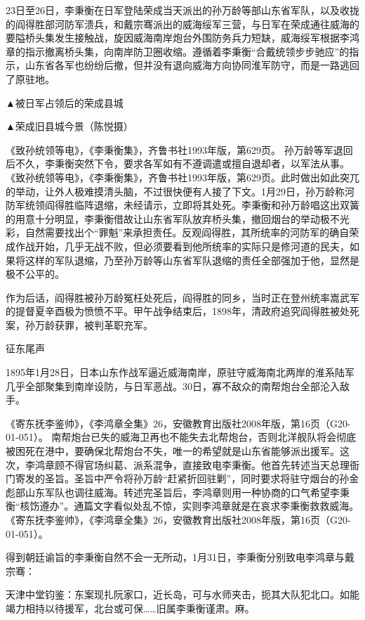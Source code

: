 \documentclass[12pt,UTF8]{ctexbook}
\begin{document}
23日至26日，李秉衡在日军登陆荣成当天派出的孙万龄等部山东省军队，以及收拢的阎得胜部河防军溃兵，和戴宗骞派出的威海绥军三营，与日军在荣成通往威海的要隘桥头集发生接触战，旋因威海南岸炮台外围防务兵力短缺，威海绥军根据李鸿章的指示撤离桥头集，向南岸防卫圈收缩。遵循着李秉衡“合戴统领步步驰应”的指示，山东省各军也纷纷后撤，但并没有退向威海方向协同淮军防守，而是一路逃回了原驻地。


▲被日军占领后的荣成县城


▲荣成旧县城今景（陈悦摄）

《致孙统领等电》，《李秉衡集》，齐鲁书社1993年版，第629页。
孙万龄等军退回后不久，李秉衡突然下令，要求各军如有不遵调遣或擅自退却者，以军法从事。 《致孙统领等电》，《李秉衡集》，齐鲁书社1993年版，第629页。此时做出如此突兀的举动，让外人极难摸清头脑，不过很快便有人接了下文。1月29日，孙万龄称河防军统领阎得胜临阵退缩，未经请示，立即将其处死。李秉衡和孙万龄唱这出双簧的用意十分明显，李秉衡借故让山东省军队放弃桥头集，撤回烟台的举动极不光彩，自然需要找出个“罪魁”来承担责任。反观阎得胜，其所统率的河防军的确自荣成作战开始，几乎无战不败，但必须要看到他所统率的实际只是修河道的民夫，如果将这样的军队退缩，乃至孙万龄等山东省军队退缩的责任全部强加于他，显然是极不公平的。

作为后话，阎得胜被孙万龄冤枉处死后，阎得胜的同乡，当时正在登州统率嵩武军的提督夏辛酉极为愤愤不平。甲午战争结束后，1898年，清政府追究阎得胜被处死案，孙万龄获罪，被判革职充军。

征东尾声

1895年1月28日，日本山东作战军逼近威海南岸，原驻守威海南北两岸的淮系陆军几乎全部聚集到南岸设防，与日军恶战。30日，寡不敌众的南帮炮台全部沦入敌手。

《寄东抚李鉴帅》，《李鸿章全集》26，安徽教育出版社2008年版，第16页（G20-01-051）。
南帮炮台已失的威海卫再也不能失去北帮炮台，否则北洋舰队将会彻底被困死在港中，要确保北帮炮台不失，唯一的希望就是山东省能够派出援军。这次，李鸿章顾不得官场纠葛、派系混争，直接致电李秉衡。他首先转述当天总理衙门寄发的圣旨。圣旨中严令将孙万龄“赶紧折回驻剿”，同时要求将驻守烟台的孙金彪部山东军队也调往威海。转述完圣旨后，李鸿章则用一种协商的口气希望李秉衡“核饬遵办”。通篇文字看似处乱不惊，实则李鸿章就是在哀求李秉衡救救威海。 《寄东抚李鉴帅》，《李鸿章全集》26，安徽教育出版社2008年版，第16页（G20-01-051）。

得到朝廷谕旨的李秉衡自然不会一无所动，1月31日，李秉衡分别致电李鸿章与戴宗骞：

天津中堂钧鉴：东案现扎阮家口，近长岛，可与水师夹击，扼其大队犯北口。如能竭力相持以待援军，北台或可保……旧属李秉衡谨肃。麻。
\end{document}
